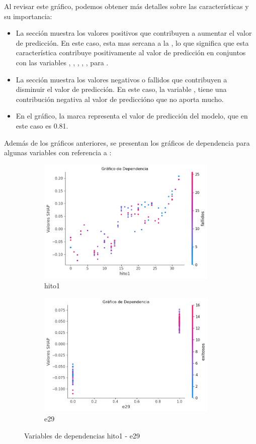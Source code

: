 Al revisar este gráfico, podemos obtener más detalles sobre las características y su importancia:

\begin{itemize}
    \item La sección  muestra los valores positivos que contribuyen a aumentar el valor de predicción. En este caso,  esta mas sercana a la , lo que significa que esta característica contribuye positivamente al valor de predicción en conjuntos con las variables , , , , ,  para .
    \item La sección  muestra los valores negativos o fallidos que contribuyen a disminuir el valor de predicción. En este caso, la variable , tiene una contribución negativa al valor de prediccióno que no aporta mucho.
    \item En el gráfico, la marca  representa el valor de predicción del modelo, que en este caso es 0.81.
\end{itemize}

Además de los gráficos anteriores, se presentan los gráficos de dependencia para algunas variables con referencia a :

\begin{figure}[H]

    \begin{subfigure}{0.5\textwidth}
        \includegraphics[width=0.9\linewidth, height=6cm]{img/shap_rf/hito1.png}
        \caption{hito1}
        \label{fig:dependencia_hito1}
    \end{subfigure}
    \begin{subfigure}{0.5\textwidth}
        \includegraphics[width=0.9\linewidth, height=6cm]{img/shap_rf/e29.png}
        \caption{e29}
        \label{fig:dependencia_e29}
    \end{subfigure}

    \caption{Variables de dependencias hito1 - e29}
    \label{fig:image2}
\end{figure}

